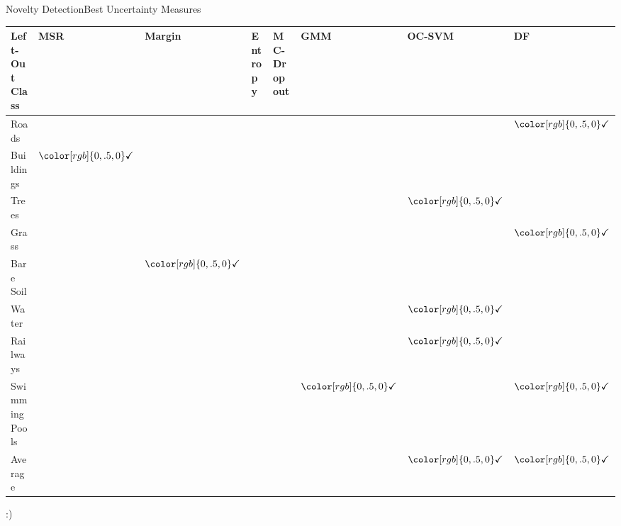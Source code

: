 \documentclass{beamer}
\begin{document}
\newcommand{\tick}{${\color[rgb]{0, .5, 0}\mathbf{\checkmark}}$}

\begin{frame}{Novelty Detection}{Best Uncertainty Measures}
	\begin{table}[H]
		\centering
		\footnotesize
		\begin{tabular}{@{}l|llll|lll@{}}
			\toprule
			Left-Out Class & MSR  & Margin     & Entropy & \gls{MC-Dropout} & \gls{GMM}     & \gls{OC-SVM}  & \gls{DF}                \\ \midrule
			Roads          &   &    &     &   &  &  &  \tick \\
			Buildings    & \tick  &    &     &   &  &  &   \\
			Trees          &   &    &     &   &  &   \tick &\\ 
			Grass          &   &    &     &   &  &  &  \tick \\ 
			Bare Soil      &   & \tick   &     &   &  &  &   \\ 
			Water          &   &    &     &   &  &  \tick &   \\ 
			Railways       &   &    &     &   &  & \tick &   \\ 
			Swimming Pools &   &    &     &   &  \tick  &  &  \tick \\ \midrule
			Average       &   &    &     &   &  &  \tick &   \tick \\ \bottomrule
		\end{tabular}
	\end{table}
	\pause
	\centering
	:)
\end{frame}
\end{document}
